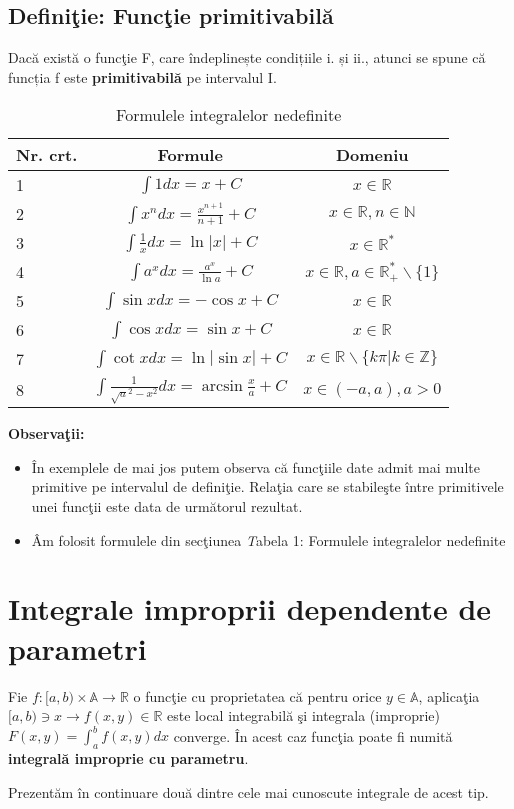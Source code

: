 \documentclass{article}
\begin{document}
\subsection{Defini\c tie: Func\c tie primitivabil\u a}
Dacă exist\u a o func\c tie F, care îndeplinește condițiile i. și ii., atunci se spune că funcția f este {\bf primitivabilă} pe intervalul I.
\begin{table}[htbp]
\begin{center}
\begin{tabular}{| l | c | c |}
\hline
Nr. crt. & Formule & Domeniu \\ \hline
 1 & $\int 1 dx = x + C$ & $x \in \mathbb{R}$ \\ \hline 
 2 & $\int x^n dx = \frac{x^{n + 1}}{n + 1} + C$ & $x \in \mathbb{R}, n \in \mathbb{N}$\\ \hline
 3 & $\int \frac 1x dx = \ln |x| + C$ & $x \in \mathbb{R}^*$\\ \hline
 4 & $\int a^x dx = \frac{a^x}{\ln a} + C$ & $x \in \mathbb{R}, a \in {\mathbb{R}}_+^* \backslash \{1\}$\\ \hline
 5 & $\int \sin x dx = -\cos x + C$ & $x \in \mathbb{R}$\\ \hline
 6 & $\int \cos x dx = \sin x + C$ & $x \in \mathbb{R}$\\ \hline
 7 & $\int \cot x dx = \ln |\sin x|+ C$ & $x \in \mathbb{R}\backslash \{k\pi | k \in \mathbb{Z}\}$\\ \hline
 8 & $\int \frac1{\sqrt a^2 - x^2} dx = \arcsin \frac xa + C$ & $x \in (-a, a), a > 0$\\ \hline
\end{tabular}
\end{center}
\caption{Formulele integralelor nedefinite}
\end{table}
\newline
{\bf Observa\c tii:}
\begin{itemize}
\item \^ In exemplele de mai jos putem observa c\u a func\c tiile date admit mai multe primitive pe intervalul de defini\c tie. Rela\c tia care se stabile\c ste \^ intre primitivele unei func\c tii este data de urm\u atorul rezultat.
\item \^ Am folosit formulele din sec\c tiunea {\emph Tabela 1: Formulele integralelor nedefinite}
\end{itemize}
\section{Integrale improprii dependente de parametri}
\hspace{0.55 cm}
Fie $f : [a, b) \times \mathbb{A} \to \mathbb{R}$ o func\c tie cu proprietatea c\u a pentru orice $y \in \mathbb{A}$, aplica\c tia $[a, b) \ni x \to f(x, y) \in \mathbb{R}$ este local integrabil\u a \c si integrala (improprie) $F(x, y) = \int_{a}^{b} f(x, y)dx$ converge. \^ In acest caz func\c tia poate fi numit\u a {\bf integral\u a improprie cu parametru}. \cite{text4} \par
Prezent\u am \^ in continuare dou\u a dintre cele mai cunoscute integrale de acest tip.
\end{document}

